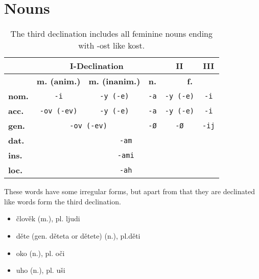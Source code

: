\documentclass{article}
\begin{document}
\section*{Nouns}
\begin{table}[h!]
\centering
\renewcommand{\arraystretch}{1.3}
\begin{tabular}{|l|c|c|c|c|c|}
\hline
\textbf{} & \multicolumn{3}{c|}{\textbf{I-Declination}} & \textbf{II} & \textbf{III} \\
\hline
\textbf{} & \textbf{m. (anim.)} & \textbf{m. (inanim.)} & \textbf{n.} & \multicolumn{2}{c|}{\textbf{f.}} \\
\hline
\textbf{nom.} & \texttt{-i} & \texttt{-y (-e)} & \texttt{-a} & \texttt{-y (-e)} & \texttt{-i} \\
\hline
\textbf{acc.} & \texttt{-ov (-ev)} & \texttt{-y (-e)} & \texttt{-a} & \texttt{-y (-e)} & \texttt{-i} \\
\hline
\textbf{gen.} & \multicolumn{2}{c|}{\texttt{-ov (-ev)}} & \texttt{-Ø} & \texttt{-Ø} & \texttt{-ij} \\
\hline
\textbf{dat.} & \multicolumn{5}{c|}{\texttt{-am}} \\
\hline
\textbf{ins.} & \multicolumn{5}{c|}{\texttt{-ami}} \\
\hline
\textbf{loc.} & \multicolumn{5}{c|}{\texttt{-ah}} \\
\hline
\end{tabular}
\caption{The third declination includes all feminine nouns ending with -ost like kost. }
\end{table}

These words have some irregular forms, but apart from that they are declinated like words form the third declination.
\begin{itemize}
    \item člověk (m.), pl. ljudi
    \item děte (gen. děteta or dětete) (n.), pl.děti
    \item oko (n.), pl. oči
    \item uho (n.), pl. uši
\end{itemize}
\end{document}

